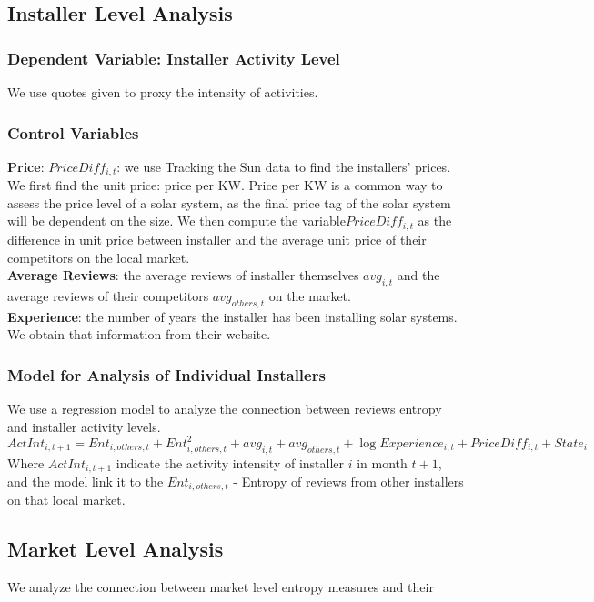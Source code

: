 \documentclass[mnsc,blindrev]{informs3} %
\begin{document}
\subsection{Installer Level Analysis}

\subsubsection{Dependent Variable: Installer Activity Level}
We use quotes given to proxy the intensity of activities. 
 \subsubsection{Control Variables\\} 
\textbf{Price}:   $PriceDiff_{i,t}$: we use Tracking the Sun data to find the installers' prices. We first find the unit price: price per KW. Price per KW is a common way to assess the price level of a solar system, as the final price tag of the solar system will be dependent on the size. We then compute the variable$PriceDiff_{i,t}$ as the difference in unit price between installer and the average unit price of their competitors on the local market. \\
\textbf{Average Reviews}: the average reviews of installer themselves $avg_{i,t}$ and the average reviews of their competitors $avg_{others,t}$ on the market. \\
\textbf{Experience}: the number of years the installer has been installing solar systems. We obtain that information from their website. 

\subsubsection{Model for Analysis of Individual Installers}
We use a regression model to analyze the connection between reviews entropy and installer activity levels. 
\begin{equation}
    ActInt_{i,t+1}=Ent_{i,others,t}+Ent_{i,others,t}^2+ 
    avg_{i,t}+avg_{others,t}+\log{Experience_{i,t}}+PriceDiff_{i,t}+State_{i}
\end{equation}
Where $ActInt_{i,t+1}$ indicate the activity intensity of installer $i$ in month $t+1$, and the model link it to the $Ent_{i,others,t}$ - Entropy of reviews from other installers on that local market. 

\subsection{Market Level Analysis}
We analyze the connection between market level entropy measures and their  
\end{document}
